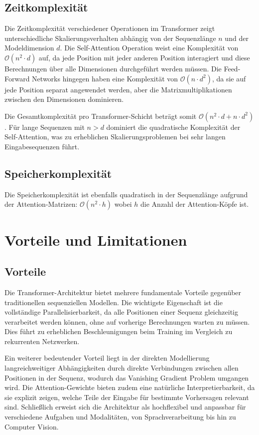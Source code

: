 \subsection{Zeitkomplexität}

Die Zeitkomplexität verschiedener Operationen im Transformer zeigt unterschiedliche Skalierungsverhalten abhängig von der Sequenzlänge $n$ und der Modeldimension $d$. Die Self-Attention Operation weist eine Komplexität von $\mathcal{O}(n^2 \cdot d)$ auf, da jede Position mit jeder anderen Position interagiert und diese Berechnungen über alle Dimensionen durchgeführt werden müssen. Die Feed-Forward Networks hingegen haben eine Komplexität von $\mathcal{O}(n \cdot d^2)$, da sie auf jede Position separat angewendet werden, aber die Matrixmultiplikationen zwischen den Dimensionen dominieren.

Die Gesamtkomplexität pro Transformer-Schicht beträgt somit $\mathcal{O}(n^2 \cdot d + n \cdot d^2)$. Für lange Sequenzen mit $n > d$ dominiert die quadratische Komplexität der Self-Attention, was zu erheblichen Skalierungsproblemen bei sehr langen Eingabesequenzen führt.

\subsection{Speicherkomplexität}

Die Speicherkomplexität ist ebenfalls quadratisch in der Sequenzlänge aufgrund der Attention-Matrizen: $\mathcal{O}(n^2 \cdot h)$ wobei $h$ die Anzahl der Attention-Köpfe ist.

\section{Vorteile und Limitationen}

\subsection{Vorteile}

Die Transformer-Architektur bietet mehrere fundamentale Vorteile gegenüber traditionellen sequenziellen Modellen. Die wichtigste Eigenschaft ist die vollständige Parallelisierbarkeit, da alle Positionen einer Sequenz gleichzeitig verarbeitet werden können, ohne auf vorherige Berechnungen warten zu müssen. Dies führt zu erheblichen Beschleunigungen beim Training im Vergleich zu rekurrenten Netzwerken.

Ein weiterer bedeutender Vorteil liegt in der direkten Modellierung langreichweitiger Abhängigkeiten durch direkte Verbindungen zwischen allen Positionen in der Sequenz, wodurch das Vanishing Gradient Problem umgangen wird. Die Attention-Gewichte bieten zudem eine natürliche Interpretierbarkeit, da sie explizit zeigen, welche Teile der Eingabe für bestimmte Vorhersagen relevant sind. Schließlich erweist sich die Architektur als hochflexibel und anpassbar für verschiedene Aufgaben und Modalitäten, von Sprachverarbeitung bis hin zu Computer Vision.

